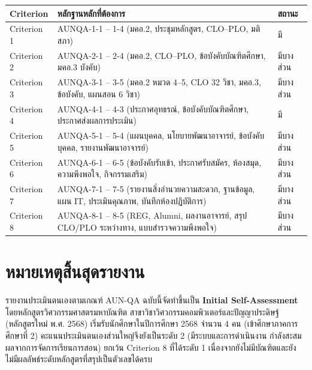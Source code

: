 \setlength{\tabcolsep}{3pt}
\begin{tabularx}{\linewidth}{|>{\raggedright\arraybackslash}p{3.2cm}|Y|>{\raggedright\arraybackslash}p{3.5cm}|}
\hline
\textbf{Criterion} & \textbf{หลักฐานหลักที่ต้องการ} & \textbf{สถานะ} \\
\hline
Criterion 1 & AUNQA-1-1 -- 1-4 (มคอ.2, ประชุมหลักสูตร, CLO--PLO, มติสภา) & มี \\
Criterion 2 & AUNQA-2-1 -- 2-4 (มคอ.2, CLO--PLO, ข้อบังคับบัณฑิตศึกษา, มคอ.3 บังคับ) & มีบางส่วน \\
Criterion 3 & AUNQA-3-1 -- 3-5 (มคอ.2 หมวด 4--5, CLO 32 วิชา, มคอ.3, ข้อบังคับ, แผนสอน 6 วิชา) & มีบางส่วน \\
Criterion 4 & AUNQA-4-1 -- 4-3 (ประกาศอุทธรณ์, ข้อบังคับบัณฑิตศึกษา, ประกาศส่งผลการประเมิน) & มี \\
Criterion 5 & AUNQA-5-1 -- 5-4 (แผนบุคคล, นโยบายพัฒนาอาจารย์, ข้อบังคับบุคคล, รายงานพัฒนาอาจารย์) & มีบางส่วน \\
Criterion 6 & AUNQA-6-1 -- 6-5 (ข้อบังคับรับเข้า, ประกาศรับสมัคร, ห้องสมุด, ความพึงพอใจ, กิจกรรมเสริม) & มีบางส่วน \\
Criterion 7 & AUNQA-7-1 -- 7-5 (รายงานสิ่งอำนวยความสะดวก, ฐานข้อมูล, แผน IT, ประเมินคุณภาพ, บันทึกห้องปฏิบัติการ) & มีบางส่วน \\
Criterion 8 & AUNQA-8-1 -- 8-5 (REG, Alumni, ผลงานอาจารย์, สรุป CLO/PLO ระหว่างทาง, แบบสำรวจความพึงพอใจ) & มีบางส่วน \\
\hline
\end{tabularx}

\section*{หมายเหตุสิ้นสุดรายงาน}

\bigskip

รายงานประเมินตนเองตามเกณฑ์ AUN-QA ฉบับนี้จัดทำขึ้นเป็น \textbf{Initial Self-Assessment} โดยหลักสูตรวิศวกรรมศาสตรมหาบัณฑิต สาขาวิชาวิศวกรรมคอมพิวเตอร์และปัญญาประดิษฐ์ (หลักสูตรใหม่ พ.ศ. 2568) เริ่มรับนักศึกษาในปีการศึกษา 2568 จำนวน 4 คน (เข้าศึกษาภาคการศึกษาที่ 2) คะแนนประเมินตนเองส่วนใหญ่จึงยังเป็นระดับ 2 (มีระบบและการดำเนินงาน กำลังสะสมผลจากการจัดการเรียนการสอน) ยกเว้น Criterion 8 ที่ได้ระดับ 1 เนื่องจากยังไม่มีบัณฑิตและยังไม่มีผลลัพธ์ระดับหลักสูตรที่สรุปเป็นตัวเลขได้ครบ


